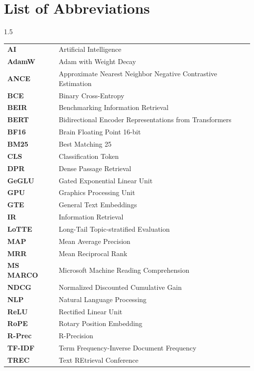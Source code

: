 \chapter*{List of Abbreviations}

\begin{spacing}{1.5}
\begin{longtable}{@{}p{3cm}p{10cm}}
\textbf{AI} & Artificial Intelligence \\
\textbf{AdamW} & Adam with Weight Decay \\
\textbf{ANCE} & Approximate Nearest Neighbor Negative Contrastive Estimation \\
\textbf{BCE} & Binary Cross-Entropy \\
\textbf{BEIR} & Benchmarking Information Retrieval \\
\textbf{BERT} & Bidirectional Encoder Representations from Transformers \\
\textbf{BF16} & Brain Floating Point 16-bit \\
\textbf{BM25} & Best Matching 25 \\
\textbf{CLS} & Classification Token \\
\textbf{DPR} & Dense Passage Retrieval \\
\textbf{GeGLU} & Gated Exponential Linear Unit \\
\textbf{GPU} & Graphics Processing Unit \\
\textbf{GTE} & General Text Embeddings \\
\textbf{IR} & Information Retrieval \\
\textbf{LoTTE} & Long-Tail Topic-stratified Evaluation \\
\textbf{MAP} & Mean Average Precision \\
\textbf{MRR} & Mean Reciprocal Rank \\
\textbf{MS MARCO} & Microsoft Machine Reading Comprehension \\
\textbf{NDCG} & Normalized Discounted Cumulative Gain \\
\textbf{NLP} & Natural Language Processing \\
\textbf{ReLU} & Rectified Linear Unit \\
\textbf{RoPE} & Rotary Position Embedding \\
\textbf{R-Prec} & R-Precision \\
\textbf{TF-IDF} & Term Frequency-Inverse Document Frequency \\
\textbf{TREC} & Text REtrieval Conference \\
\end{longtable}
\end{spacing}

